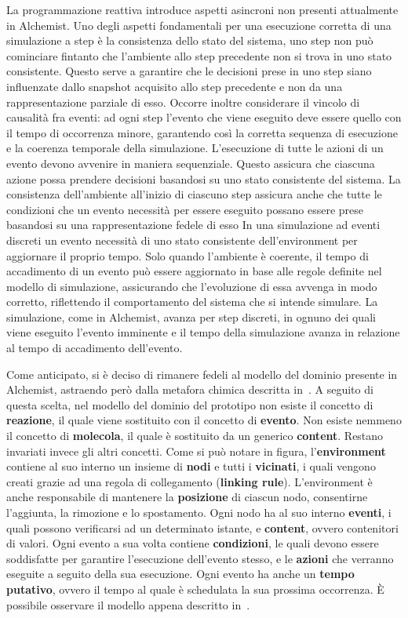 \documentclass[12pt,a4paper,openright,twoside]{book}
\begin{document}
La programmazione reattiva introduce aspetti asincroni non presenti attualmente in Alchemist. Uno degli aspetti fondamentali per una esecuzione corretta di una simulazione a step è la consistenza dello stato del sistema, uno step non può cominciare fintanto che l'ambiente allo step precedente non si trova in uno stato consistente. Questo serve a garantire che le decisioni prese in uno step siano influenzate dallo snapshot acquisito allo step precedente e non da una rappresentazione parziale di esso. 
Occorre inoltre considerare il vincolo di causalità fra eventi: ad ogni step l'evento che viene eseguito deve essere quello con il tempo di occorrenza minore, garantendo così la corretta sequenza di esecuzione e la coerenza temporale della simulazione. 
L'esecuzione di tutte le azioni di un evento devono avvenire in maniera sequenziale. Questo assicura che ciascuna azione possa prendere decisioni basandosi su uno stato consistente del sistema. La consistenza dell'ambiente all'inizio di ciascuno step assicura anche che tutte le condizioni che un evento necessità per essere eseguito possano essere prese basandosi su una rappresentazione fedele di esso
In una simulazione ad eventi discreti un evento necessità di uno stato consistente dell'environment per aggiornare il proprio tempo. Solo quando l'ambiente è coerente, il tempo di accadimento di un evento può essere aggiornato in base alle regole definite nel modello di simulazione, assicurando che l'evoluzione di essa avvenga in modo corretto, riflettendo il comportamento del sistema che si intende simulare. 
La simulazione, come in Alchemist, avanza per step discreti, in ognuno dei quali viene eseguito l'evento imminente e il tempo della simulazione avanza in relazione al tempo di accadimento dell'evento. 

Come anticipato, si è deciso di rimanere fedeli al modello del dominio presente in Alchemist, astraendo però dalla metafora chimica descritta in~. 
A seguito di questa scelta, nel modello del dominio del prototipo non esiste il concetto di \textbf{reazione}, il quale viene sostituito con il concetto di \textbf{evento}. Non esiste nemmeno il concetto di \textbf{molecola}, il quale è sostituito da un generico \textbf{content}. Restano invariati invece gli altri concetti. 
Come si può notare in figura, l'\textbf{environment} contiene al suo interno un insieme di \textbf{nodi} e tutti i \textbf{vicinati}, i quali vengono creati grazie ad una regola di collegamento (\textbf{linking rule}). L'environment è anche responsabile di mantenere la \textbf{posizione} di ciascun nodo, consentirne l'aggiunta, la rimozione e lo spostamento. 
Ogni nodo ha al suo interno \textbf{eventi}, i quali possono verificarsi ad un determinato istante, e \textbf{content}, ovvero contenitori di valori. 
Ogni evento a sua volta contiene \textbf{condizioni}, le quali devono essere soddisfatte per garantire l'esecuzione dell'evento stesso, e le \textbf{azioni} che verranno eseguite a seguito della sua esecuzione.
Ogni evento ha anche un \textbf{tempo putativo}, ovvero il tempo al quale è schedulata la sua prossima occorrenza.
È possibile osservare il modello appena descritto in~.
\end{document}
